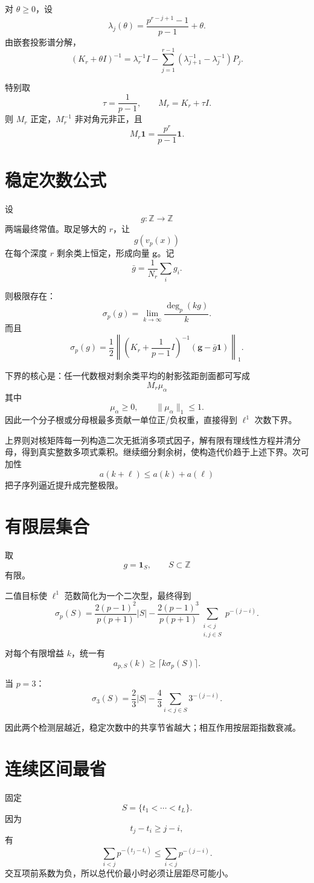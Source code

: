 \documentclass[11pt,a4paper]{ctexart}
\begin{document}
对 \(\theta\ge0\)，设
\[
\lambda_j(\theta)
=
\frac{p^{r-j+1}-1}{p-1}+\theta.
\]
由嵌套投影谱分解，
\[
\boxed{
(K_r+\theta I)^{-1}
=
\lambda_r^{-1}I
-
\sum_{j=1}^{r-1}
(\lambda_{j+1}^{-1}-\lambda_j^{-1})P_j.
}
\]

特别取
\[
\tau=\frac1{p-1},\qquad
M_r=K_r+\tau I.
\]
则 \(M_r\) 正定，\(M_r^{-1}\) 非对角元非正，且
\[
M_r\mathbf1
=
\frac{p^r}{p-1}\mathbf1.
\]

\section{稳定次数公式}
设
\[
g:\mathbb Z\to\mathbb Z
\]
两端最终常值。取足够大的 \(r\)，让
\[
g(v_p(x))
\]
在每个深度 \(r\) 剩余类上恒定，形成向量 \(\mathbf g\)。记
\[
\bar g=\frac1{N_r}\sum_i g_i.
\]

则极限存在：
\[
\boxed{
\sigma_p(g)
=
\lim_{k\to\infty}
\frac{\deg_p(kg)}k.
}
\]
而且
\[
\boxed{
\sigma_p(g)
=
\frac12
\left\|
\left(K_r+\frac1{p-1}I\right)^{-1}
(\mathbf g-\bar g\mathbf1)
\right\|_1.
}
\]

下界的核心是：任一代数根对剩余类平均的射影弦距剖面都可写成
\[
M_r\mu_\alpha
\]
其中
\[
\mu_\alpha\ge0,\qquad
\|\mu_\alpha\|_1\le1.
\]
因此一个分子根或分母根最多贡献一单位正/负权重，直接得到 \(\ell^1\) 次数下界。

上界则对核矩阵每一列构造二次无抵消多项式因子，解有限有理线性方程并清分母，得到真实整数多项式乘积。继续细分剩余树，使构造代价趋于上述下界。次可加性
\[
a(k+\ell)\le a(k)+a(\ell)
\]
把子序列逼近提升成完整极限。

\section{有限层集合}
取
\[
g=\mathbf1_S,
\qquad S\subset\mathbb Z
\]
有限。

二值目标使 \(\ell^1\) 范数简化为一个二次型，最终得到
\[
\boxed{
\sigma_p(S)
=
\frac{2(p-1)^2}{p(p+1)}|S|
-
\frac{2(p-1)^3}{p(p+1)}
\sum_{\substack{i<j\\i,j\in S}}
p^{-(j-i)}.
}
\]

对每个有限增益 \(k\)，统一有
\[
\boxed{
a_{p,S}(k)
\ge
\lceil k\sigma_p(S)\rceil.
}
\]

当 \(p=3\)：
\[
\boxed{
\sigma_3(S)
=
\frac23|S|
-
\frac43
\sum_{i<j\in S}3^{-(j-i)}.
}
\]

因此两个检测层越近，稳定次数中的共享节省越大；相互作用按层距指数衰减。

\section{连续区间最省}
固定
\[
S=\{t_1<\cdots<t_L\}.
\]
因为
\[
t_j-t_i\ge j-i,
\]
有
\[
\sum_{i<j}p^{-(t_j-t_i)}
\le
\sum_{i<j}p^{-(j-i)}.
\]
交互项前系数为负，所以总代价最小时必须让层距尽可能小。
\end{document}
